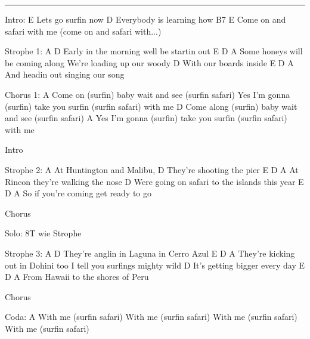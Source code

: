 \noindent\rule{\columnwidth}{1pt}

\begin{multicols}{2}
\begin{lstsong}
Intro:
E
Lets go surfin now
D
Everybody is learning how
B7                      E
Come on and safari with me
(come on and safari with...)

Strophe 1:
A                            D
Early in the morning well be startin out
     E              D       A
Some honeys will be coming along
We're loading up our woody
         D
With our boards inside
    E          D           A
And headin out singing our song

Chorus 1:
A
Come on (surfin) baby wait and see (surfin safari)
Yes I'm gonna (surfin) take you surfin (surfin safari)
with me
D
Come along (surfin) baby wait and see (surfin safari)
    A
Yes I'm gonna (surfin) take you surfin (surfin safari)
with me

Intro

Strophe 2:
A
At Huntington and Malibu,
        D
They're shooting the pier
   E              D           A
At Rincon they're walking the nose
                            D
Were going on safari to the islands this year
             E           D       A
So if you're coming get ready to go

Chorus

Solo: 8T wie Strophe

Strophe 3:
        A                   D
They're anglin in Laguna in Cerro Azul
        E              D      A
They're kicking out in Dohini too
I tell you surfings mighty wild
             D
It's getting bigger every day
     E             D         A
From Hawaii to the shores of Peru

Chorus

Coda:
     A
With me (surfin safari)
With me (surfin safari)
With me (surfin safari)
With me (surfin safari)
\end{lstsong}
\end{multicols}
\newpage

